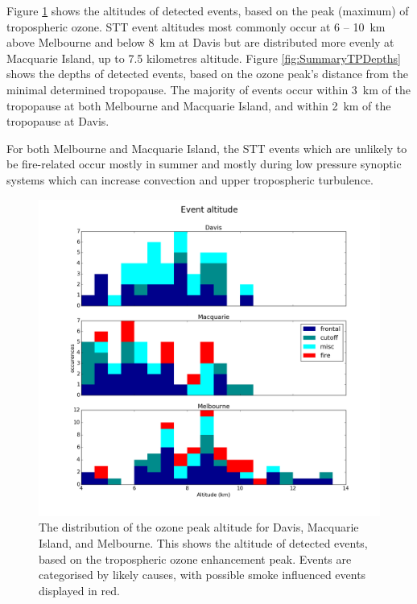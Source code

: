 \documentclass{article}
\begin{document}
  Figure \ref{fig:SummaryAltitudes} shows the altitudes of detected events, based on the peak (maximum) of tropospheric ozone.
  STT event altitudes most commonly occur at 6 -- 10~km above Melbourne and below 8~km at Davis but are distributed more evenly at Macquarie Island, up to 7.5 kilometres altitude.
  Figure \ref{fig:SummaryTPDepths} shows the depths of detected events, based on the ozone peak's distance from the minimal determined tropopause.
  The majority of events occur within 3~km of the tropopause at both Melbourne and Macquarie Island, and within 2~km of the tropopause at Davis.
  
  For both Melbourne and Macquarie Island, the STT events which are unlikely to be fire-related occur mostly in summer and mostly during low pressure synoptic systems which can increase convection and upper tropospheric turbulence.

  \begin{figure}[!htbp]
    \begin{center}
    \includegraphics[width=0.99\columnwidth]{figures/summary_altitude.png}
    \caption{The distribution of the ozone peak altitude for Davis, Macquarie Island, and Melbourne.
    This shows the altitude of detected events, based on the tropospheric ozone enhancement peak.
    Events are categorised by likely causes, with possible smoke influenced events displayed in red.}
    \label{fig:SummaryAltitudes}
    \end{center}
  \end{figure}
\end{document}
